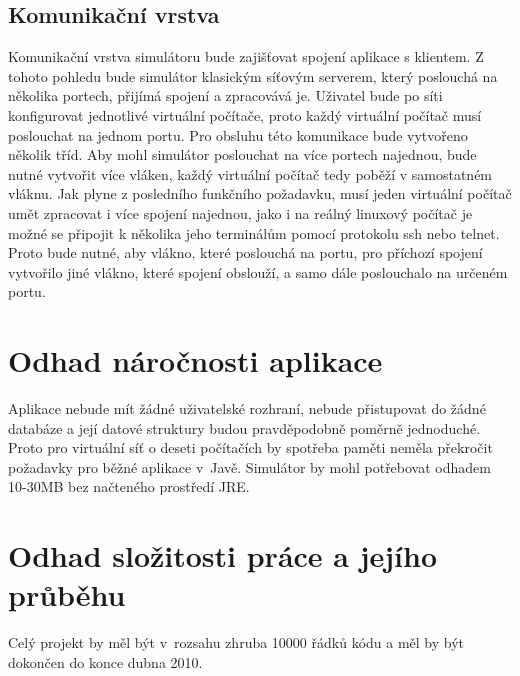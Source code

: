 \subsection{Komunikační vrstva}
Komunikační vrstva simulátoru bude zajišťovat spojení aplikace s klientem. Z tohoto pohledu bude simulátor klasickým síťovým serverem, který poslouchá na několika portech, přijímá spojení a zpracovává je. Uživatel bude po síti konfigurovat jednotlivé virtuální počítače, proto každý virtuální počítač musí poslouchat na jednom portu. Pro obsluhu této komunikace bude vytvořeno několik tříd. Aby mohl simulátor poslouchat na více portech najednou, bude nutné vytvořit více vláken, každý virtuální počítač tedy poběží v samostatném vláknu. Jak plyne z posledního funkčního požadavku, musí jeden virtuální počítač umět zpracovat i více spojení najednou, jako i na reálný linuxový počítač je možné se připojit k několika jeho terminálům pomocí protokolu ssh nebo telnet. Proto bude nutné, aby vlákno, které poslouchá na portu, pro příchozí spojení vytvořilo jiné vlákno, které spojení obslouží, a samo dále poslouchalo na určeném portu. 




\section{Odhad náročnosti aplikace}

Aplikace nebude mít žádné uživatelské rozhraní, nebude přistupovat do žádné databáze a její datové struktury budou pravděpodobně poměrně jednoduché. Proto pro virtuální síť o deseti počítačích by spotřeba paměti neměla překročit požadavky pro běžné aplikace v~Javě. Simulátor by mohl potřebovat odhadem 10-30MB bez načteného prostředí JRE.




\section{Odhad složitosti práce a jejího průběhu}

Celý projekt by měl být v~rozsahu zhruba 10000 řádků kódu a měl by být dokončen do konce dubna 2010.
